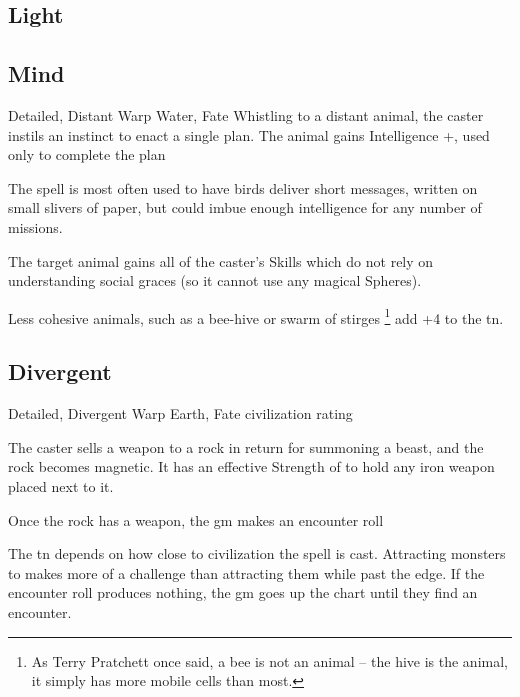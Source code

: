 \begin{multicols}{2}
\subsection{Light}


\subsection{Mind}

\label{carrierCrow}
  {Detailed, Distant}%
  {Warp}%
  {Water, Fate}%
  {}%
  {Whistling to a distant animal, the caster instils an instinct to enact a single plan.
  The animal gains Intelligence +, used only to complete the plan}%
  {
  The spell is most often used to have birds deliver short messages, written on small slivers of paper, but could imbue enough intelligence for any number of missions.

  The target animal gains all of the caster's Skills which do not rely on understanding social graces (so it cannot use any magical Spheres).

  Less cohesive animals, such as a bee-hive or swarm of stirges%
  \footnote{As Terry Pratchett once said, a bee is not an animal -- the hive is the animal, it simply has more mobile cells than most.}
  add +4 to the \gls{tn}.
  }


\subsection{Divergent}

  {Detailed, Divergent}%
  {Warp}%
  {Earth, Fate}%
  {civilization rating}%
  {The caster sells a weapon to a rock in return for summoning a beast, and the rock becomes magnetic.
  It has an effective Strength of  to hold any iron weapon placed next to it.

  Once the rock has a weapon, the \gls{gm} makes an encounter roll}%
  {
    The \gls{tn} depends on how close to civilization the spell is cast.
    Attracting monsters to  makes more of a challenge than attracting them while past the \gls{edge}.%
    If the encounter roll produces nothing, the \gls{gm} goes up the chart until they find an encounter.

}
\end{multicols}
